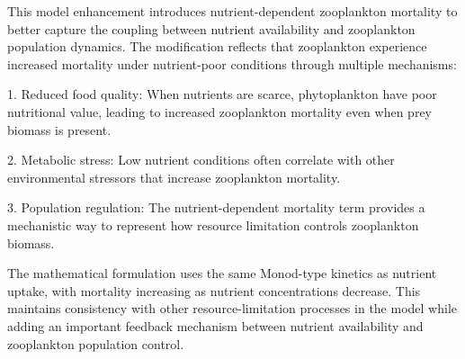 This model enhancement introduces nutrient-dependent zooplankton mortality to better capture the coupling between nutrient availability and zooplankton population dynamics. The modification reflects that zooplankton experience increased mortality under nutrient-poor conditions through multiple mechanisms:

1. Reduced food quality: When nutrients are scarce, phytoplankton have poor nutritional value, leading to increased zooplankton mortality even when prey biomass is present.

2. Metabolic stress: Low nutrient conditions often correlate with other environmental stressors that increase zooplankton mortality.

3. Population regulation: The nutrient-dependent mortality term provides a mechanistic way to represent how resource limitation controls zooplankton biomass.

The mathematical formulation uses the same Monod-type kinetics as nutrient uptake, with mortality increasing as nutrient concentrations decrease. This maintains consistency with other resource-limitation processes in the model while adding an important feedback mechanism between nutrient availability and zooplankton population control.
